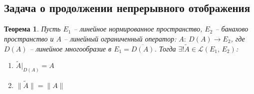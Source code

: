 \documentclass[a4paper,12pt]{article}
\theoremstyle{plain}
\newtheorem{theorem}{Теорема}[section]
\theoremstyle{definition}
\theoremstyle{remark}
\begin{document}
\subsection{Задача о продолжении непрерывного отображения}
\begin{theorem}
	Пусть $E_1$ -- линейное нормированное пространство, $E_2$ -- банахово пространство и $A$ -- линейный ограниченный оператор: $A :\: D(A) \to E_2$, где $D(A)$ -- линейное многообразие в $E_1 = \overline{D(A)}$. Тогда $\exists! \tilde{A} \in \mathcal{L}(E_1,\,E_2)$:
	\begin{enumerate}
		\item $\tilde{A}|_{D(A)} = A$
		\item $\|\tilde{A}\| = \|A\|$
	\end{enumerate}
\end{theorem}
\end{document}
